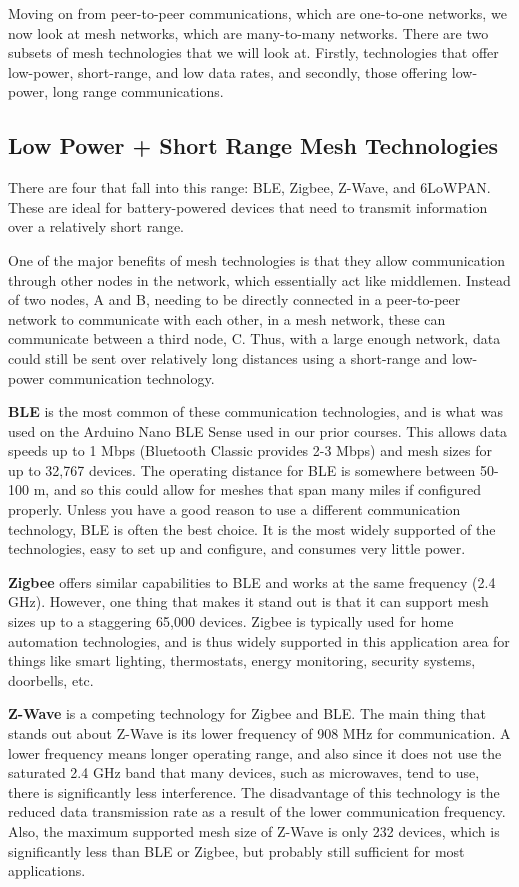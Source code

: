 {{{{{{{{{    Moving on from peer-to-peer communications, which are one-to-one networks, we now look at mesh networks, which are many-to-many networks. There are two subsets of mesh technologies that we will look at. Firstly, technologies that offer low-power, short-range, and low data rates, and secondly, those offering low-power, long range communications.
    
    \subsection{Low Power + Short Range Mesh Technologies}
    
    There are four that fall into this range: BLE, Zigbee, Z-Wave, and 6LoWPAN. These are ideal for battery-powered devices that need to transmit information over a relatively short range.
    
    One of the major benefits of mesh technologies is that they allow communication through other nodes in the network, which essentially act like middlemen. Instead of two nodes, A and B, needing to be directly connected in a peer-to-peer network to communicate with each other, in a mesh network, these can communicate between a third node, C. Thus, with a large enough network, data could still be sent over relatively long distances using a short-range and low-power communication technology. 
    
    \textbf{BLE} is the most common of these communication technologies, and is what was used on the Arduino Nano BLE Sense used in our prior courses. This allows data speeds up to 1 Mbps (Bluetooth Classic provides 2-3 Mbps) and mesh sizes for up to 32,767 devices. The operating distance for BLE is somewhere between 50-100 m, and so this could allow for meshes that span many miles if configured properly. Unless you have a good reason to use a different communication technology, BLE is often the best choice. It is the most widely supported of the technologies, easy to set up and configure, and consumes very little power.
    
    \textbf{Zigbee} offers similar capabilities to BLE and works at the same frequency (2.4 GHz). However, one thing that makes it stand out is that it can support mesh sizes up to a staggering 65,000 devices. Zigbee is typically used for home automation technologies, and is thus widely supported in this application area for things like smart lighting, thermostats, energy monitoring, security systems, doorbells, etc.
    
    \textbf{Z-Wave} is a competing technology for Zigbee and BLE. The main thing that stands out about Z-Wave is its lower frequency of 908 MHz for communication. A lower frequency means longer operating range, and also since it does not use the saturated 2.4 GHz band that many devices, such as microwaves, tend to use, there is significantly less interference. The disadvantage of this technology is the reduced data transmission rate as a result of the lower communication frequency. Also, the maximum supported mesh size of Z-Wave is only 232 devices, which is significantly less than BLE or Zigbee, but probably still sufficient for most applications.
    
}}}}}}}}}
